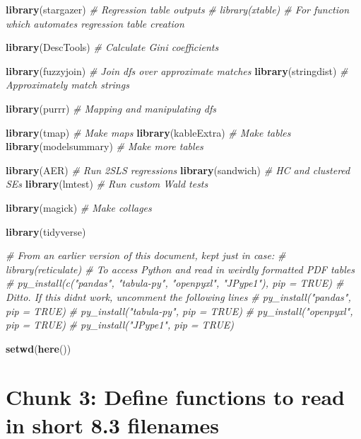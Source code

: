 \documentclass[
]{article}
\newenvironment{Shaded}{\begin{snugshade}}{\end{snugshade}}
\newcommand{\CommentTok}[1]{\textcolor[rgb]{0.56,0.35,0.01}{\textit{#1}}}
\newcommand{\FunctionTok}[1]{\textcolor[rgb]{0.13,0.29,0.53}{\textbf{#1}}}
\newcommand{\NormalTok}[1]{#1}
\begin{document}
\begin{Shaded}
\begin{Highlighting}[]
\FunctionTok{library}\NormalTok{(stargazer) }\CommentTok{\# Regression table outputs}
\CommentTok{\# library(xtable) \# For function which automates regression table creation}

\FunctionTok{library}\NormalTok{(DescTools) }\CommentTok{\# Calculate Gini coefficients}

\FunctionTok{library}\NormalTok{(fuzzyjoin) }\CommentTok{\# Join df\textquotesingle{}s over approximate matches}
\FunctionTok{library}\NormalTok{(stringdist) }\CommentTok{\# Approximately match strings}

\FunctionTok{library}\NormalTok{(purrr) }\CommentTok{\# Mapping and manipulating dfs}

\FunctionTok{library}\NormalTok{(tmap) }\CommentTok{\# Make maps}
\FunctionTok{library}\NormalTok{(kableExtra) }\CommentTok{\# Make tables}
\FunctionTok{library}\NormalTok{(modelsummary) }\CommentTok{\# Make more tables}

\FunctionTok{library}\NormalTok{(AER) }\CommentTok{\# Run 2SLS regressions}
\FunctionTok{library}\NormalTok{(sandwich) }\CommentTok{\# HC and clustered SEs }
\FunctionTok{library}\NormalTok{(lmtest) }\CommentTok{\# Run custom Wald tests}

\FunctionTok{library}\NormalTok{(magick) }\CommentTok{\# Make collages}

\FunctionTok{library}\NormalTok{(tidyverse)}


\CommentTok{\# From an earlier version of this document, kept just in case:}
\CommentTok{\# library(reticulate) \# To access Python and read in weirdly formatted PDF tables}
\CommentTok{\# py\_install(c("pandas", "tabula{-}py", "openpyxl", "JPype1"), pip = TRUE) \# Ditto. If this didn\textquotesingle{}t work, uncomment the following lines}
\CommentTok{\# py\_install("pandas", pip = TRUE)}
\CommentTok{\# py\_install("tabula{-}py", pip = TRUE)}
\CommentTok{\# py\_install("openpyxl", pip = TRUE)}
\CommentTok{\# py\_install("JPype1", pip = TRUE)}


\FunctionTok{setwd}\NormalTok{(}\FunctionTok{here}\NormalTok{())}
\end{Highlighting}
\end{Shaded}

\section*{Chunk 3: Define functions to read in short 8.3 filenames}\label{chunk-3-define-functions-to-read-in-short-8.3-filenames}
\end{document}
